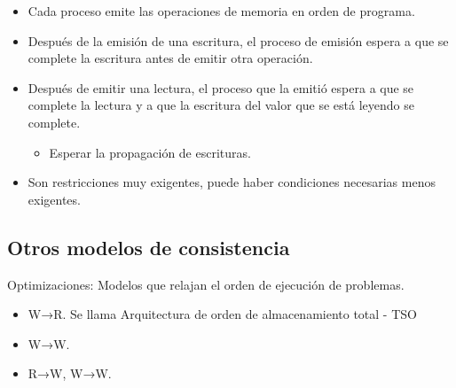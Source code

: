 \documentclass[12pt, twoside, openright]{report} %
\begin{document}
    \begin{itemize}
    
    \item
      Cada proceso emite las operaciones de memoria en orden de
      programa.
    \item
      Después de la emisión de una escritura, el proceso de emisión
      espera a que se complete la escritura antes de emitir otra
      operación.
    \item
      Después de emitir una lectura, el proceso que la emitió espera a
      que se complete la lectura y a que la escritura del valor que se
      está leyendo se complete.

      \begin{itemize}
      
      \item
        Esperar la propagación de escrituras.
      \end{itemize}
    \item
      Son restricciones muy exigentes, puede haber condiciones
      necesarias menos exigentes.
    \end{itemize}

\subsection{Otros modelos de consistencia}

 
    Optimizaciones: Modelos que relajan el orden de ejecución de
    problemas.

    \begin{itemize}
    
    \item
      W→R. Se llama Arquitectura de orden de almacenamiento total -
      TSO
    \item
      W→W.
    \item
      R→W, W→W.
    \end{itemize}
\end{document}
